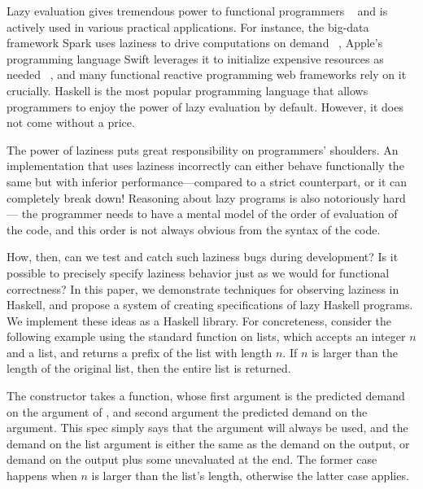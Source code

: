 \documentclass[acmsmall,review]{acmart}\settopmatter{}
\begin{document}
Lazy evaluation gives tremendous power to functional programmers
~\cite{WhyFPMatters} and is actively used in various practical
applications. For instance, the big-data framework Spark uses laziness
to drive computations on demand
~\cite{Zaharia:2012:RDD:2228298.2228301}, Apple's programming language
Swift leverages it to initialize expensive resources as needed
~\cite{Swift}, and many functional reactive programming web frameworks
rely on it crucially\cn {}. Haskell is the most popular programming language that
allows programmers to enjoy the power of lazy evaluation by
default. However, it does not come without a price.

The power of laziness puts great responsibility on programmers'
shoulders. An implementation that uses laziness incorrectly can either
behave functionally the same but with inferior  performance---compared to a strict counterpart, or it can
completely break down! Reasoning about lazy
programs is also notoriously hard --- the programmer needs to have a
mental model of the order of evaluation of the code, and this order is
not always obvious from the syntax of the code.

How, then, can we test and catch such laziness bugs during
development? Is it possible to precisely specify laziness behavior
just as we would for functional correctness?
%
In this paper, we demonstrate techniques for observing laziness in
Haskell, and propose a system of creating specifications of lazy
Haskell programs. We implement these ideas as a Haskell library. For
concreteness, consider the following example using the standard
 function on lists, which accepts an integer $n$ and a list, and returns
a prefix of the list with length $n$. If $n$ is larger than the length
of the original list, then the entire list is returned.
%
%
The  constructor takes a function, whose first
argument  is the predicted demand on the  argument
of , and second argument the predicted demand on the \lk{[a]}
argument. This spec simply says that the  argument will always
be used, and the demand on the list argument is either the same as the
demand on the output, or demand on the output plus some
unevaluated  at the end. The former case happens when $n$ is
larger than the list's length, otherwise the latter case applies.
\end{document}
